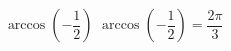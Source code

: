  {$\arccos \left( -\dfrac{1}{2} \right)$ }
{ $\arccos \left( -\dfrac{1}{2} \right) = \dfrac{2\pi}{3}$}
